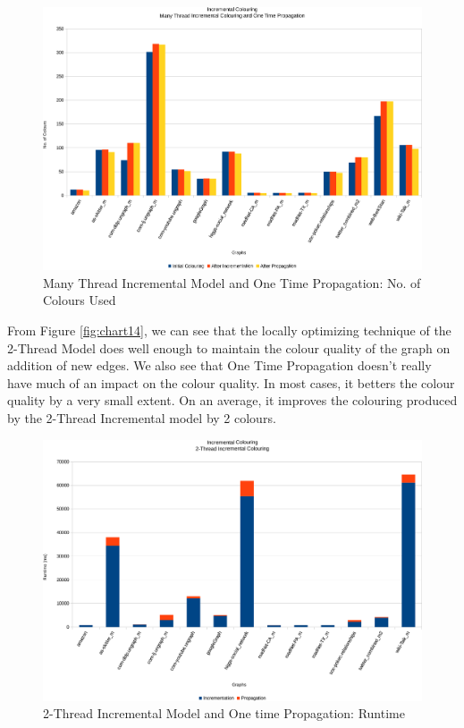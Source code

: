 \documentclass[MTech]{iitmdiss}
\begin{document}
\begin{figure}[h]
    \centering
    \includegraphics[width=\textwidth,keepaspectratio=true]{chartNewest13.pdf}
    \caption{
        Many Thread Incremental Model and One Time Propagation: No. of Colours Used
    }
    \label{fig:chart15}
\end{figure}

From Figure \ref{fig:chart14}, we can see that the locally optimizing technique of the 2-Thread Model does well enough to maintain the colour quality of the graph on addition of new edges. We also see that One Time Propagation doesn't really have much of an impact on the colour quality. In most cases, it betters the colour quality by a very small extent. On an average, it improves the colouring produced by the 2-Thread Incremental model by 2 colours.

\begin{figure}[h]
    \centering
    \includegraphics[width=\textwidth,keepaspectratio=true]{chartNewest23.pdf}
    \caption{
        2-Thread Incremental Model and One time Propagation: Runtime
    }
    \label{fig:chart16}
\end{figure}
\end{document}
